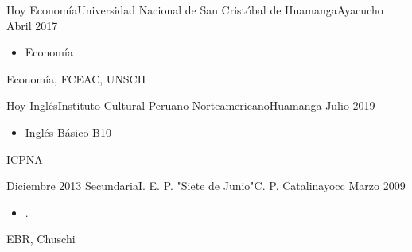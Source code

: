 

\begin{experiences}
  \experience
    {Hoy}   {Economía}{Universidad Nacional de San Cristóbal de Huamanga}{Ayacucho}
    {Abril 2017} {
                      \begin{itemize}
                        \item Economía                  
                       
                      \end{itemize}
                    }
                    {Economía, FCEAC, UNSCH}
                    
  \emptySeparator
  
   \experience
    {Hoy}   {Inglés}{Instituto Cultural Peruano Norteamericano}{Huamanga}
    {Julio 2019} 
                  {
                      \begin{itemize}
                        \item Inglés Básico B10                   
                       
                      \end{itemize}
                    }
                    {ICPNA}
 
 \emptySeparator
  
   \experience
    {Diciembre 2013}   {Secundaria}{I. E. P. "Siete de Junio"}{C. P. Catalinayocc}
    {Marzo 2009} 
                  {
                      \begin{itemize}
                        \item .                  
                       
                      \end{itemize}
                    }
                    {EBR, Chuschi}
\end{experiences}